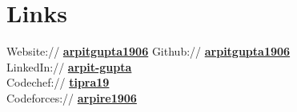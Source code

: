 \documentclass[]{deedy-resume-openfont}
\begin{document}
\begin{minipage}[t]{0.35\textwidth}

\section{Links}
Website:// \href{https://arpitgupta1906.github.io/}{\bf arpitgupta1906} 
Github:// \href{https://github.com/arpitgupta1906}{\bf arpitgupta1906} \\
LinkedIn://  \href{https://www.linkedin.com/in/arpit-gupta-46462819b/}{\bf arpit-gupta} \\
Codechef://  \href{https://www.codechef.com/users/tipra19}{\bf tipra19} \\
Codeforces:// \href{https://codeforces.com/profile/arpire1906}{\bf arpire1906} \\

%
%

\end{minipage}
\hfill
\end{document}
